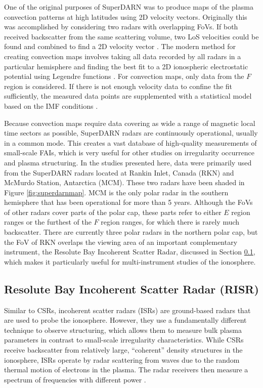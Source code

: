 One of the original purposes of SuperDARN was to produce maps of the plasma convection patterns at high latitudes using 2D velocity vectors.  Originally this was accomplished by considering two radars with overlapping FoVs.  If both received backscatter from the same scattering volume, two LoS velocities could be found and combined to find a 2D velocity vector \citep{Ruohoniemi1989}.  The modern method for creating convection maps involves taking all data recorded by all radars in a particular hemisphere and finding the best fit to a 2D ionospheric electrostatic potential using Legendre functions \citep{Ruohoniemi1998}.  For convection maps, only data from the \(F\) region is considered.  If there is not enough velocity data to confine the fit sufficiently, the measured data points are supplemented with a statistical model based on the IMF conditions \citep{Ruohoniemi1995,Ruohoniemi2005}.

Because convection maps require data covering as wide a range of magnetic local time sectors as possible, SuperDARN radars are continuously operational, usually in a common mode.  This creates a vast database of high-quality measurements of small-scale FAIs, which is very useful for other studies on irregularity occurrence and plasma structuring.  In the studies presented here, data were primarily used from the SuperDARN radars located at Rankin Inlet, Canada (RKN) and McMurdo Station, Antarctica (MCM).  These two radars have been shaded in Figure \ref{fig:superdarnmap}.  MCM is the only polar radar in the southern hemisphere that has been operational for more than 5 years.  Although the FoVs of other radars cover parts of the polar cap, these parts refer to either \(E\) region ranges or the furthest of the \(F\) region ranges, for which there is rarely much backscatter.  There are currently three polar radars in the northern polar cap, but the FoV of RKN overlaps the viewing area of an important complementary instrument, the Resolute Bay Incoherent Scatter Radar, discussed in Section \ref{sec:isr}, which makes it particularly useful for multi-instrument studies of the ionosphere.

\subsection{Resolute Bay Incoherent Scatter Radar (RISR)}
\label{sec:isr}
Similar to CSRs, incoherent scatter radars (ISRs) are ground-based radars that are used to probe the ionosphere.  However, they use a fundamentally different technique to observe structuring, which allows them to measure bulk plasma parameters in contrast to small-scale irregularity characteristics.  While CSRs receive backscatter from relatively large, ``coherent'' density structures in the ionosphere, ISRs operate by radar scattering from waves due to the random thermal motion of electrons in the plasma.  The radar receivers then measure a spectrum of frequencies with different power \citep{Gordon1958}.

